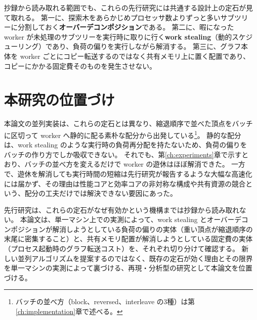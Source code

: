 抄録から読み取れる範囲でも、これらの先行研究には共通する設計上の定石が見て取れる。
第一に、探索木をあらかじめプロセッサ数よりずっと多いサブツリーに分割しておく\textbf{オーバーデコンポジション}である。
第二に、暇になった worker が未処理のサブツリーを実行時に取りに行く\textbf{work stealing}（動的スケジューリング）であり、負荷の偏りを実行しながら解消する。
第三に、グラフ本体を worker ごとにコピー転送するのではなく共有メモリ上に置く配置であり、コピーにかかる固定費そのものを発生させない。

\section{本研究の位置づけ}
\label{sec:related-position}

本論文の並列実装は、これらの定石とは異なり、縮退順序で並べた頂点をバッチに区切って worker へ静的に配る素朴な配分から出発している\footnote{バッチの並べ方（block、reversed、interleave の3種）は第\ref{ch:implementation}章で述べる。}。
静的な配分は、work stealing のような実行時の負荷再分配を持たないため、負荷の偏りをバッチの作り方でしか吸収できない。
それでも、第\ref{ch:experiments}章で示すとおり、バッチの並べ方を変えるだけで worker の遊休はほぼ解消できた。
一方で、遊休を解消しても実行時間の短縮は先行研究が報告するような大幅な高速化には届かず、その理由は性能コアと効率コアの非対称な構成や共有資源の競合という、配分の工夫だけでは解決できない要因にあった。

先行研究は、これらの定石がなぜ有効かという機構までは抄録から読み取れない。
本論文は、単一マシン上での実測によって、work stealing とオーバーデコンポジションが解消しようとしている負荷の偏りの実体（重い頂点が縮退順序の末尾に密集すること）と、共有メモリ配置が解消しようとしている固定費の実体（プロセス起動時のグラフ転送コスト）を、それぞれ切り分けて確認する。
新しい並列アルゴリズムを提案するのではなく、既存の定石が効く理由とその限界を単一マシンの実測によって裏づける、再現・分析型の研究として本論文を位置づける。

